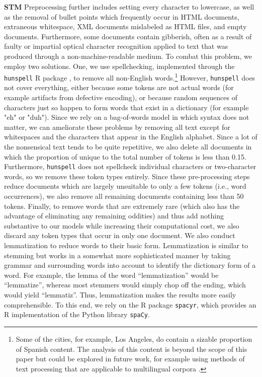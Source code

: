 \documentclass[11pt]{article}
\begin{document}
{\bf STM}
Preprocessing further includes setting every character to lowercase, as well as the removal of bullet points which frequently occur in HTML documents, extraneous whitespace, XML documents mislabeled as HTML files, and empty documents. Furthermore, some documents contain gibberish, often as a result of faulty or impartial optical character recognition applied to text that was produced through a non-machine-readable medium. To combat this problem, we employ two solutions. One, we use spellchecking, implemented through the \texttt{hunspell} R package \citep{hunspell}, to remove all non-English words.\footnote{Some of the cities, for example, Los Angeles, do contain a sizable proportion of Spanish content. The analysis of this content is beyond the scope of this paper but could be explored in future work, for example using methods of text processing that are applicable to multilingual corpora \citep{lucas2015computer}. } However, \texttt{hunspell} does not cover everything, either because some tokens are not actual words (for example artifacts from defective encoding), or because random sequences of characters just so happen to form words that exist in a dictionary (for example "eh" or "duh"). Since we rely on a bag-of-words model in which syntax does not matter, we can ameliorate these problems by removing all text except for whitespaces and the characters that appear in the English alphabet. Since a lot of the nonsensical text tends to be quite repetitive, we also delete all documents in which the proportion of unique to the total number of tokens is less than 0.15. Furthermore, \texttt{hunspell} does not spellcheck individual characters or two-character words, so we remove these token types entirely. Since these pre-processing steps reduce documents which are largely unsuitable to only a few tokens (i.e., word occurrences), we also remove all remaining documents containing less than 50 tokens. Finally, to remove words that are extremely rare (which also has the advantage of eliminating any remaining oddities) and thus add nothing substantive to our models while increasing their computational cost, we also discard any token types that occur in only one document. We also conduct lemmatization to reduce words to their basic form. Lemmatization is similar to stemming but works in a somewhat more sophisticated manner by taking grammar and surrounding words into account to identify the dictionary form of a word. For example, the lemma of the word ``lemmatization'' would be ``lemmatize'', whereas most stemmers would simply chop off the ending, which would yield ``lemmatiz''. Thus, lemmatization makes the results more easily comprehensible. To this end, we rely on the R package \texttt{spacyr}, which provides an R implementation of the Python library \texttt{spaCy}.
\end{document}
